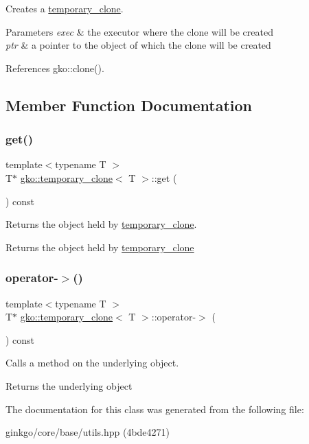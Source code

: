 Creates a \hyperlink{classgko_1_1temporary__clone}{temporary\+\_\+clone}. 


\begin{DoxyParams}{Parameters}
{\em exec} & the executor where the clone will be created \\
\hline
{\em ptr} & a pointer to the object of which the clone will be created \\
\hline
\end{DoxyParams}


References gko\+::clone().



\subsection{Member Function Documentation}
\mbox{\label{classgko_1_1temporary__clone_a38042e39a039070cc97e225435d5ed9e}} 
\subsubsection{\texorpdfstring{get()}{get()}}
{\footnotesize\ttfamily template$<$typename T $>$ \\
T$\ast$ \hyperlink{classgko_1_1temporary__clone}{gko\+::temporary\+\_\+clone}$<$ T $>$\+::get (\begin{DoxyParamCaption}{ }\end{DoxyParamCaption}) const}



Returns the object held by \hyperlink{classgko_1_1temporary__clone}{temporary\+\_\+clone}. 

\begin{DoxyReturn}{Returns}
the object held by \hyperlink{classgko_1_1temporary__clone}{temporary\+\_\+clone} 
\end{DoxyReturn}
\mbox{\label{classgko_1_1temporary__clone_a007bc247a9a250dcec8cdadb54710106}} 
\subsubsection{\texorpdfstring{operator-\/$>$()}{operator->()}}
{\footnotesize\ttfamily template$<$typename T $>$ \\
T$\ast$ \hyperlink{classgko_1_1temporary__clone}{gko\+::temporary\+\_\+clone}$<$ T $>$\+::operator-\/$>$ (\begin{DoxyParamCaption}{ }\end{DoxyParamCaption}) const}



Calls a method on the underlying object. 

\begin{DoxyReturn}{Returns}
the underlying object 
\end{DoxyReturn}


The documentation for this class was generated from the following file\+:\begin{DoxyCompactItemize}
\item 
ginkgo/core/base/utils.\+hpp (4bde4271)\end{DoxyCompactItemize}
